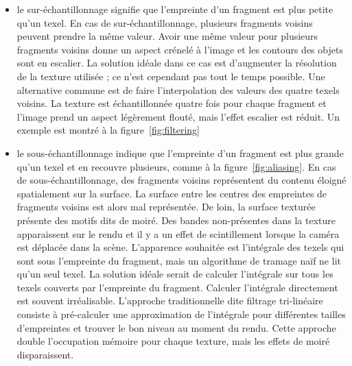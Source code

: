 \begin{itemize}
    \item le sur-échantillonnage signifie que l'empreinte d'un fragment est plus petite qu'un texel. En cas de sur-échantillonnage, plusieurs fragments voisins peuvent prendre la même valeur. Avoir une même valeur pour plusieurs fragments voisins donne un aspect crénelé à l'image et les contours des objets sont en escalier. La solution idéale dans ce cas est d'augmenter la résolution de la texture utilisée ; ce n'est cependant pas tout le temps possible. Une alternative commune est de faire l'interpolation des valeurs des quatre texels voisins. La texture est échantillonnée quatre fois pour chaque fragment et l'image prend un aspect légèrement flouté, mais l'effet escalier est réduit. Un exemple est montré à la figure~\ref{fig:filtering}
    \item le sous-échantillonnage indique que l'empreinte d'un fragment est plus grande qu'un texel et en recouvre plusieurs, comme à la figure~\ref{fig:aliasing}. En cas de sous-échantillonnage, des fragments voisins représentent du contenu éloigné spatialement sur la surface. La surface entre les centres des empreintes de fragments voisins est alors mal représentée. De loin, la surface texturée présente des motifs dits de moiré. Des bandes non-présentes dans la texture apparaissent sur le rendu et il y a un effet de scintillement lorsque la caméra est déplacée dans la scène. L'apparence souhaitée est l'intégrale des texels qui sont sous l'empreinte du fragment, mais un algorithme de tramage naïf ne lit qu'un seul texel. La solution idéale serait de calculer l'intégrale sur tous les texels couverts par l'empreinte du fragment. Calculer l'intégrale directement est souvent irréalisable. L'approche traditionnelle dite filtrage tri-linéaire consiste à pré-calculer une approximation de l'intégrale pour différentes tailles d'empreintes et trouver le bon niveau au moment du rendu. Cette approche double l'occupation mémoire pour chaque texture, mais les effets de moiré disparaissent.

\end{itemize}

